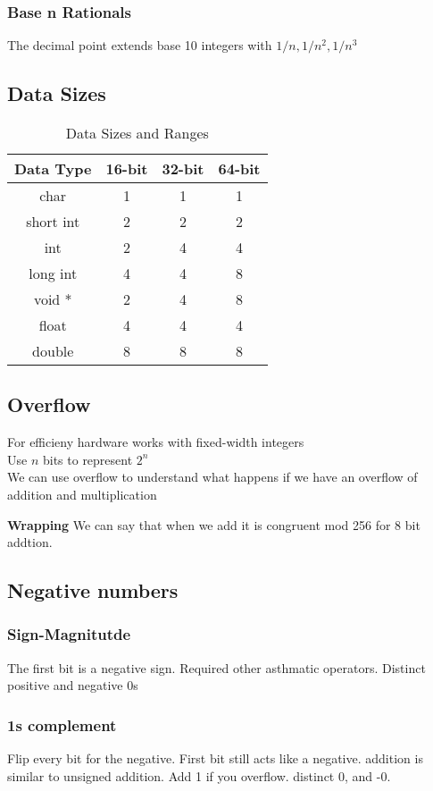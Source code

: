 \documentclass[answers,12pt,addpoints]{exam}
\begin{document}
\subsubsection{Base n Rationals}
The decimal point extends base 10 integers with $1/n , 1/n^2, 1/n^3$
\subsection{Data Sizes}
\begin{table}[h!]
\centering
\begin{tabular}{|c|c|c|c|}
\hline
Data Type & 16-bit & 32-bit & 64-bit \\ \hline
char & 1 & 1 & 1 \\ \hline
short int & 2 & 2 & 2 \\ \hline
int & 2 & 4 & 4 \\ \hline
long int & 4 & 4 & 8 \\ \hline
void * & 2 & 4 & 8 \\ \hline
float & 4 & 4 & 4 \\ \hline
double & 8 & 8 & 8 \\ \hline
\end{tabular}
\caption{Data Sizes and Ranges}
\label{tab:data-sizes}
\end{table}

\subsection{Overflow}
For efficieny hardware works with fixed-width integers\\
Use $n$ bits to represent $2^n$ \\
We can use overflow to understand what happens if we have an overflow of addition and multiplication

\textbf{Wrapping}
We can say that when we add it is congruent mod 256 for 8 bit addtion.

\subsection{Negative numbers}
\subsubsection{Sign-Magnitutde}
The first bit is a negative sign. Required other asthmatic operators. Distinct positive and negative 0s
\subsubsection{1s complement}
Flip every bit for the negative. First bit still acts like a negative. addition is similar to unsigned addition. Add 1 if you overflow. distinct 0, and -0.
\end{document}

